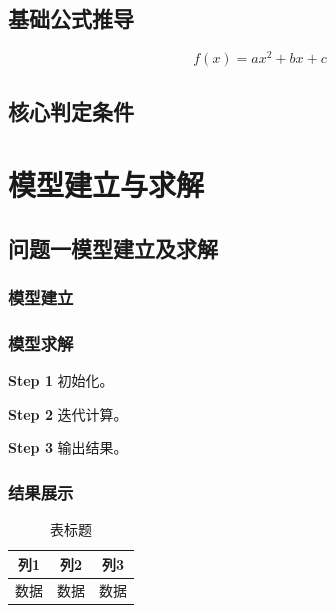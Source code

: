 \documentclass[12pt,a4paper]{ctexart}
\theoremstyle{definition}
\theoremstyle{plain}
\theoremstyle{remark}
\newcommand{\step}[1]{\par\noindent\textbf{Step #1}\quad}
\begin{document}

\subsection{基础公式推导}

\begin{equation}
f(x) = ax^2 + bx + c
\label{eq:example}
\end{equation}

\subsection{核心判定条件}



\section{模型建立与求解}

\subsection{问题一模型建立及求解}

\subsubsection{模型建立}


\subsubsection{模型求解}

\step{1} 初始化。

\step{2} 迭代计算。

\step{3} 输出结果。

\subsubsection{结果展示}

\begin{table}[H]
\centering
\caption{表标题}
\label{tab:example}
\begin{tabular}{ccc}
\toprule
列1 & 列2 & 列3 \\
\midrule
数据 & 数据 & 数据 \\
\bottomrule
\end{tabular}
\end{table}
\end{document}
